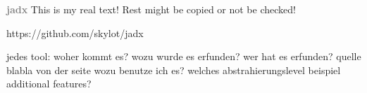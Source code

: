 \newline\newline\textbf{\textcolor{gray}{jadx}}\newline
This is my real text! Rest might be copied or not be checked!



https://github.com/skylot/jadx


jedes tool:\newline
woher kommt es?\newline
wozu wurde es erfunden?\newline
wer hat es erfunden? quelle\newline
blabla von der seite\newline
wozu benutze ich es?\newline
welches abstrahierungslevel\newline
beispiel\newline
additional features?\newline
